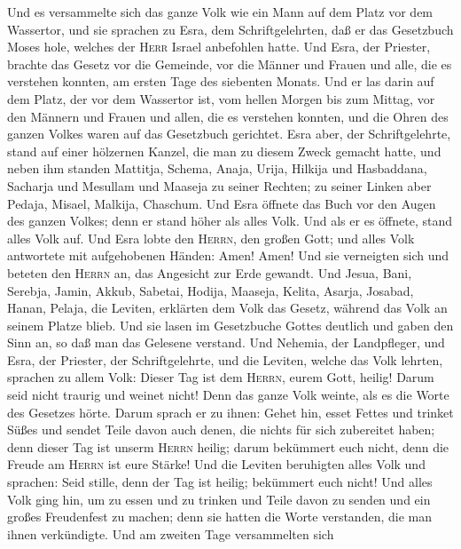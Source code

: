  Und es versammelte sich das ganze Volk wie ein Mann auf
dem Platz vor dem Wassertor, und sie sprachen zu Esra, dem
Schriftgelehrten, daß er das Gesetzbuch Moses hole, welches der
\textsc{Herr} Israel anbefohlen hatte.  Und Esra, der
Priester, brachte das Gesetz vor die Gemeinde, vor die Männer und Frauen
und alle, die es verstehen konnten, am ersten Tage des siebenten Monats.
 Und er las darin auf dem Platz, der vor dem Wassertor
ist, vom hellen Morgen bis zum Mittag, vor den Männern und Frauen und
allen, die es verstehen konnten, und die Ohren des ganzen Volkes waren
auf das Gesetzbuch gerichtet.  Esra aber, der
Schriftgelehrte, stand auf einer hölzernen Kanzel, die man zu diesem
Zweck gemacht hatte, und neben ihm standen Mattitja, Schema, Anaja,
Urija, Hilkija und Hasbaddana, Sacharja und Mesullam und Maaseja zu
seiner Rechten; zu seiner Linken aber Pedaja, Misael, Malkija, Chaschum.
 Und Esra öffnete das Buch vor den Augen des ganzen
Volkes; denn er stand höher als alles Volk. Und als er es öffnete, stand
alles Volk auf.  Und Esra lobte den \textsc{Herrn}, den
großen Gott; und alles Volk antwortete mit aufgehobenen Händen: Amen!
Amen! Und sie verneigten sich und beteten den \textsc{Herrn} an, das
Angesicht zur Erde gewandt.  Und Jesua, Bani, Serebja,
Jamin, Akkub, Sabetai, Hodija, Maaseja, Kelita, Asarja, Josabad, Hanan,
Pelaja, die Leviten, erklärten dem Volk das Gesetz, während das Volk an
seinem Platze blieb.  Und sie lasen im Gesetzbuche Gottes
deutlich und gaben den Sinn an, so daß man das Gelesene verstand.
 Und Nehemia, der Landpfleger, und Esra, der Priester, der
Schriftgelehrte, und die Leviten, welche das Volk lehrten, sprachen zu
allem Volk: Dieser Tag ist dem \textsc{Herrn}, eurem Gott, heilig! Darum
seid nicht traurig und weinet nicht! Denn das ganze Volk weinte, als es
die Worte des Gesetzes hörte.  Darum sprach er zu ihnen:
Gehet hin, esset Fettes und trinket Süßes und sendet Teile davon auch
denen, die nichts für sich zubereitet haben; denn dieser Tag ist unserm
\textsc{Herrn} heilig; darum bekümmert euch nicht, denn die Freude am
\textsc{Herrn} ist eure Stärke!  Und die Leviten
beruhigten alles Volk und sprachen: Seid stille, denn der Tag ist
heilig; bekümmert euch nicht!  Und alles Volk ging hin,
um zu essen und zu trinken und Teile davon zu senden und ein großes
Freudenfest zu machen; denn sie hatten die Worte verstanden, die man
ihnen verkündigte.  Und am zweiten Tage versammelten sich
